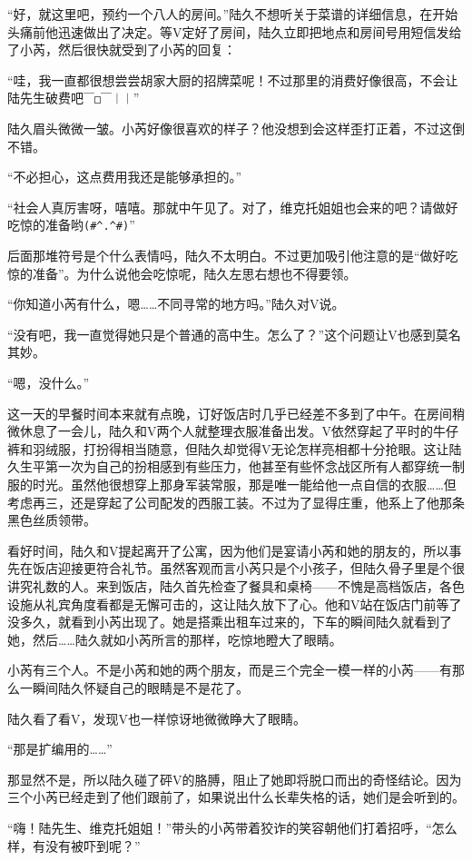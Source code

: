 “好，就这里吧，预约一个八人的房间。”陆久不想听关于菜谱的详细信息，在开始头痛前他迅速做出了决定。等V定好了房间，陆久立即把地点和房间号用短信发给了小芮，然后很快就受到了小芮的回复：

“哇，我一直都很想尝尝胡家大厨的招牌菜呢！不过那里的消费好像很高，不会让陆先生破费吧\verb!￣□￣｜｜!”

陆久眉头微微一皱。小芮好像很喜欢的样子？他没想到会这样歪打正着，不过这倒不错。

“不必担心，这点费用我还是能够承担的。”

“社会人真厉害呀，嘻嘻。那就中午见了。对了，维克托姐姐也会来的吧？请做好吃惊的准备哟\verb!(#^.^#)!”

后面那堆符号是个什么表情吗，陆久不太明白。不过更加吸引他注意的是“做好吃惊的准备”。为什么说他会吃惊呢，陆久左思右想也不得要领。

“你知道小芮有什么，嗯……不同寻常的地方吗。”陆久对V说。

“没有吧，我一直觉得她只是个普通的高中生。怎么了？”这个问题让V也感到莫名其妙。

“嗯，没什么。”

这一天的早餐时间本来就有点晚，订好饭店时几乎已经差不多到了中午。在房间稍微休息了一会儿，陆久和V两个人就整理衣服准备出发。V依然穿起了平时的牛仔裤和羽绒服，打扮得相当随意，但陆久却觉得V无论怎样亮相都十分抢眼。这让陆久生平第一次为自己的扮相感到有些压力，他甚至有些怀念战区所有人都穿统一制服的时光。虽然他很想穿上那身军装常服，那是唯一能给他一点自信的衣服……但考虑再三，还是穿起了公司配发的西服工装。不过为了显得庄重，他系上了他那条黑色丝质领带。

看好时间，陆久和V提起离开了公寓，因为他们是宴请小芮和她的朋友的，所以事先在饭店迎接更符合礼节。虽然客观而言小芮只是个小孩子，但陆久骨子里是个很讲究礼数的人。来到饭店，陆久首先检查了餐具和桌椅——不愧是高档饭店，各色设施从礼宾角度看都是无懈可击的，这让陆久放下了心。他和V站在饭店门前等了没多久，就看到小芮出现了。她是搭乘出租车过来的，下车的瞬间陆久就看到了她，然后……陆久就如小芮所言的那样，吃惊地瞪大了眼睛。

小芮有三个人。不是小芮和她的两个朋友，而是三个完全一模一样的小芮——有那么一瞬间陆久怀疑自己的眼睛是不是花了。

陆久看了看V，发现V也一样惊讶地微微睁大了眼睛。

“那是扩编用的……”

那显然不是，所以陆久碰了砰V的胳膊，阻止了她即将脱口而出的奇怪结论。因为三个小芮已经走到了他们跟前了，如果说出什么长辈失格的话，她们是会听到的。

“嗨！陆先生、维克托姐姐！”带头的小芮带着狡诈的笑容朝他们打着招呼，“怎么样，有没有被吓到呢？”

